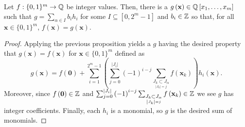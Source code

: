 \begin{proposition}
	Let \(f: \{0, 1\} ^{m} \to \mathbb{Q}\) be integer values. Then, there is a \(g\left( \textbf{x} \right) \in \mathbb{Q}\left[ x_1, \ldots, x_{m} \right]  \) such that \(g = \sum_{\alpha \in I}^{} b_{i}h_{i}\) for some \(I \subseteq \left[ 0, 2^{m}-1 \right] \) and \(b_{i} \in \mathbb{Z}\) so that, for all \(\textbf{x} \in \{0, 1\} ^{m}\), \(f\left( \textbf{x} \right) = g\left( \textbf{x} \right)  \).
\end{proposition}
\begin{proof}
	Applying the previous proposition yields a \(g\) having the desired property that \(g\left( \textbf{x} \right)  = f\left( \textbf{x} \right) \) for \(\textbf{x} \in \{0, 1\} ^{m}\) defined as \[
		g\left( \textbf{x} \right)  = f\left( \textbf{0} \right) + \sum_{i= 1}^{2^{m}-1} \left( \sum_{j=0}^{\left| J_{i} \right| } \left( -1 \right) ^{i-j} \sum_{\underset{\left| J_{k} \right| = j}{J_{k} \subset J_{\alpha}}}^{}f\left( \textbf{x}_{k} \right)  \right)  h_{i}\left( \textbf{x} \right)
	.\]
	Moreover, since \(f\left( \textbf{0} \right) \in \mathbb{Z} \) and \(\sum_{j=0}^{\left| J_{i} \right| } \left( -1 \right) ^{i-j} \sum_{\underset{\left| J_{k} \right| = j}{J_{k} \subset J_{\alpha}}}^{} f\left( \textbf{x}_{k} \right) \in \mathbb{Z} \) we see \(g\) has integer coefficients. Finally, each \(h_{i}\) is a monomial, so \(g\) is the desired sum of monomials.
\end{proof}

